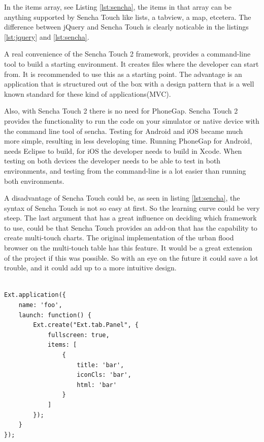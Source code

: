 \begin{description}
In the items array, see Listing \ref{lst:sencha}, the items in that array can be anything supported by Sencha Touch like lists, a tabview, a map, etcetera. The difference between jQuery and Sencha Touch is clearly noticable in the listings \ref{lst:jquery} and \ref{lst:sencha}.

A real convenience of the Sencha Touch 2 framework, provides a command-line tool to build a starting environment. It creates files where the developer can start from. It is recommended to use this as a starting point. The advantage is an application that is structured out of the box with a design pattern that is a well known standard for these kind of applications(MVC). 

Also, with Sencha Touch 2 there is no need for PhoneGap. Sencha Touch 2 provides the functionality to run the code on your simulator or native device with the command line tool of sencha. Testing for Android and iOS became much more simple, resulting in less developing time. Running PhoneGap for Android, needs Eclipse\cite{eclipse} to build, for iOS the developer needs to build in Xcode\cite{xcode}. When testing on both devices the developer needs to be able to test in both environments, and testing from the command-line is a lot easier than running both environments. 
 
A disadvantage of Sencha Touch could be, as seen in listing \ref{lst:sencha}, the syntax of Sencha Touch is not so easy at first. So the learning curve could be very steep.
The last argument that has a great influence on deciding which framework to use, could be that Sencha Touch provides an add-on that has the capability to create multi-touch charts. The original implementation of the urban flood browser on the multi-touch table has this feature. It would be a great extension of the project if this was possible. So with an eye on the future it could save a lot trouble, and it could add up to a more intuitive design.

\vspace{1cm}
\begin{lstlisting}[caption=Sencha Touch application example. This example creates an application with the name 'foo'.  The html can be placed inside the items array, label={lst:sencha}]

Ext.application({
    name: 'foo',
    launch: function() {
        Ext.create("Ext.tab.Panel", {
            fullscreen: true,
            items: [
                {
                    title: 'bar',
                    iconCls: 'bar',
                    html: 'bar'
                }
            ]
        });
    }
});
\end{lstlisting}
\end{description}

